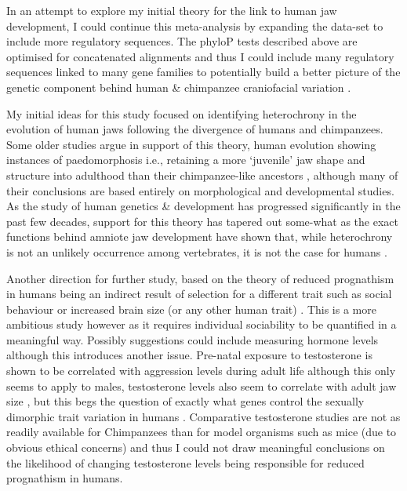 \documentclass{article}[12pt]
\begin{document}
In an attempt to explore my initial theory for the link to human jaw development, I could continue this meta-analysis by expanding the data-set to include more regulatory sequences. The phyloP tests described above are optimised for concatenated alignments and thus I could include many regulatory sequences linked to many gene families to potentially build a better picture of the genetic component behind human \& chimpanzee craniofacial variation \parencite{Prescott2015, PhyloP}.

My initial ideas for this study focused on identifying heterochrony in the evolution of human jaws following the divergence of humans and chimpanzees. Some older studies \parencite{Shea1989, Heterochrony} argue in support of this theory, human evolution showing instances of paedomorphosis i.e., retaining a more ‘juvenile’ jaw shape and structure into adulthood than their chimpanzee-like ancestors \parencite{Morris2019, Heterochrony2}, although many of their conclusions are based entirely on morphological and developmental studies. As the study of human genetics \& development has progressed significantly in the past few decades, support for this theory has tapered out some-what as the exact functions behind amniote jaw development have shown that, while heterochrony is not an unlikely occurrence among vertebrates, it is not the case for humans \parencite{noHeterochrony}.

Another direction for further study, based on the theory of reduced prognathism in humans being an indirect result of selection for a different trait such as social behaviour or increased brain size (or any other human trait) \parencite{Martinez2009}. This is a more ambitious study however as it requires individual sociability to be quantified in a meaningful way. Possibly suggestions could include measuring hormone levels although this introduces another issue. Pre-natal exposure to testosterone is shown to be correlated with aggression levels during adult life although this only seems to apply to males, testosterone levels also seem to correlate with adult jaw size \parencite{Cieri2014, Roosenboom2018, Verdonck1999}, but this begs the question of exactly what genes control the sexually dimorphic trait variation in humans \parencite{Badyaev2002}. Comparative testosterone studies are not as readily available for Chimpanzees than for model organisms such as mice (due to obvious ethical concerns) and thus I could not draw meaningful conclusions on the likelihood of changing testosterone levels being responsible for reduced prognathism in humans.
\end{document}
